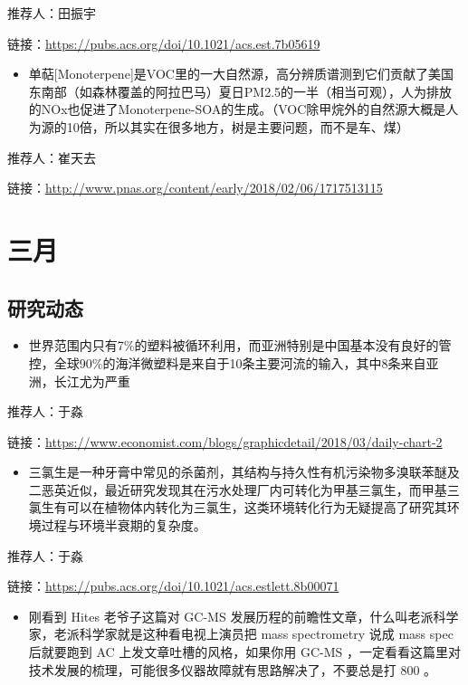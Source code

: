 \documentclass[]{book}
\providecommand{\tightlist}{%
  \setlength{\itemsep}{0pt}\setlength{\parskip}{0pt}}
\begin{document}
推荐人：田振宇

链接：\url{https://pubs.acs.org/doi/10.1021/acs.est.7b05619}

\begin{itemize}
\tightlist
\item
  单萜{[}Monoterpene{]}是VOC里的一大自然源，高分辨质谱测到它们贡献了美国东南部（如森林覆盖的阿拉巴马）夏日PM2.5的一半（相当可观），人为排放的NOx也促进了Monoterpene-SOA的生成。（VOC除甲烷外的自然源大概是人为源的10倍，所以其实在很多地方，树是主要问题，而不是车、煤）
\end{itemize}

推荐人：崔天去

链接：\url{http://www.pnas.org/content/early/2018/02/06/1717513115}

\hypertarget{ux4e09ux6708}{%
\section*{三月}\label{ux4e09ux6708}}

\hypertarget{ux7814ux7a76ux52a8ux6001-4}{%
\subsection*{研究动态}\label{ux7814ux7a76ux52a8ux6001-4}}

\begin{itemize}
\tightlist
\item
  世界范围内只有7\%的塑料被循环利用，而亚洲特别是中国基本没有良好的管控，全球90\%的海洋微塑料是来自于10条主要河流的输入，其中8条来自亚洲，长江尤为严重
\end{itemize}

推荐人：于淼

链接：\url{https://www.economist.com/blogs/graphicdetail/2018/03/daily-chart-2}

\begin{itemize}
\tightlist
\item
  三氯生是一种牙膏中常见的杀菌剂，其结构与持久性有机污染物多溴联苯醚及二恶英近似，最近研究发现其在污水处理厂内可转化为甲基三氯生，而甲基三氯生有可以在植物体内转化为三氯生，这类环境转化行为无疑提高了研究其环境过程与环境半衰期的复杂度。
\end{itemize}

推荐人：于淼

链接：\url{https://pubs.acs.org/doi/10.1021/acs.estlett.8b00071}

\begin{itemize}
\tightlist
\item
  刚看到 Hites 老爷子这篇对 GC-MS 发展历程的前瞻性文章，什么叫老派科学家，老派科学家就是这种看电视上演员把 mass spectrometry 说成 mass spec 后就要跑到 AC 上发文章吐槽的风格，如果你用 GC-MS ，一定看看这篇里对技术发展的梳理，可能很多仪器故障就有思路解决了，不要总是打 800 。
\end{itemize}
\end{document}
